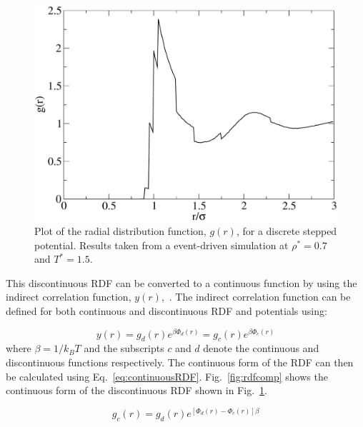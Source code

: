 \documentclass[12pt]{UoAthesis} \usepackage{booktabs}
\begin{document}
\begin{figure}[htp] 
  \begin{center}
    \includegraphics[clip,scale=0.45]{figures/rdfrough} 
    \caption[Plot of the radial distribution function for a discrete
    stepped potential]
    {\label{fig:rdfrough} Plot of the radial distribution
      function, $g(r)$, for a discrete stepped potential. Results
      taken from a event-driven simulation at $\rho^*=0.7$ and $T^*=1.5$.}
  \end{center}
\end{figure}

This discontinuous RDF can be converted to a continuous function by
using the indirect correlation function, $y(r)$,~\cite{Chapela1989}.
The indirect correlation function can be defined for both continuous
and discontinuous RDF and potentials using:

\begin{equation}
  \label{eq:ICF}
  y(r) = g_d(r)e^{\beta\Phi_d(r)} = g_c(r)e^{\beta\Phi_c(r)}
\end{equation}
where $\beta = 1/k_BT$ and the subscripts $c$ and $d$ denote the
continuous and discontinuous functions respectively.  The continuous
form of the RDF can then be calculated using
Eq.~\eqref{eq:continuousRDF}.  Fig.~\ref{fig:rdfcomp} shows the
continuous form of the discontinuous RDF shown in
Fig.~\ref{fig:rdfrough}.

\begin{equation}
  \label{eq:continuousRDF}
  g_c(r)=g_d(r)e^{[\Phi_d(r)-\Phi_c(r)]\beta}
\end{equation}
\end{document}
